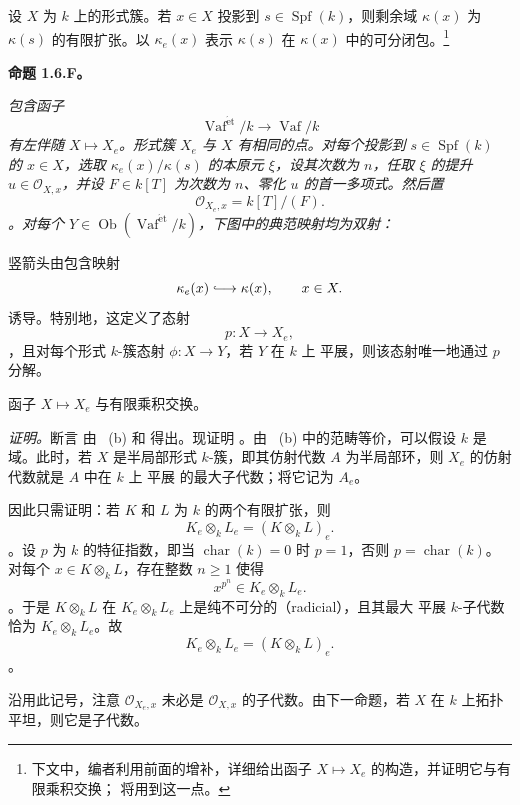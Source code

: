 设 \(X\) 为 \(k\) 上的形式簇。若 \(x\in X\) 投影到 \(s\in\operatorname{Spf}(k)\)，则剩余域 \(\kappa(x)\) 为 \(\kappa(s)\) 的有限扩张。以 \(\kappa_e(x)\) 表示 \(\kappa(s)\) 在 \(\kappa(x)\) 中的可分闭包。\footnote{\label{sga3:VIIB:nde:73}下文中，编者利用前面的增补，详细给出函子 \(X\mapsto X_e\) 的构造，并证明它与有限乘积交换； 将用到这一点。}

\medskip\noindent\textbf{命题 1.6.F。} \label{sga3:VIIB:1.6.F}{\itshape {} 包含函子 \[
  \operatorname{Vaf}^{\mathrm{\acute{e}t}}/k
  \longrightarrow
  \operatorname{Vaf}/k
\] 有左伴随 \(X\mapsto X_e\)。形式簇 \(X_e\) 与 \(X\) 有相同的点。对每个投影到 \(s\in\operatorname{Spf}(k)\) 的 \(x\in X\)，选取 \(\kappa_e(x)/\kappa(s)\) 的本原元 \(\xi\)，设其次数为 \(n\)，任取 \(\xi\) 的提升 \(u\in\mathcal O_{X,x}\)，并设 \(F\in k[T]\) 为次数为 \(n\)、零化 \(u\) 的首一多项式。然后置 \[
  \mathcal O_{X_e,x}=k[T]/(F).
\]。对每个 \(Y\in\operatorname{Ob}(\operatorname{Vaf}^{\mathrm{\acute{e}t}}/k)\)，下图中的典范映射均为双射：\begin{center} \label{sga3:VIIB:1.6.F:hom-square} \end{center}竖箭头由包含映射 \[
  \kappa_e(x)\lhook\joinrel\longrightarrow\kappa(x),
  \qquad x\in X.
\] 诱导。特别地，这定义了态射 \[
  p:X\longrightarrow X_e,
\]，且对每个形式 \(k\)-簇态射 \(\phi:X\to Y\)，若 \(Y\) 在 \(k\) 上 平展，则该态射唯一地通过 \(p\) 分解。

 函子 \(X\mapsto X_e\) 与有限乘积交换。}

\medskip\noindent\textit{证明。}断言 \textup{} 由 ~\textup{(b)} 和  得出。现证明 \textup{}。由 ~\textup{(b)} 中的范畴等价，可以假设 \(k\) 是域。此时，若 \(X\) 是半局部形式 \(k\)-簇，即其仿射代数 \(A\) 为半局部环，则 \(X_e\) 的仿射代数就是 \(A\) 中在 \(k\) 上 平展 的最大子代数；将它记为 \(A_e\)。

因此只需证明：若 \(K\) 和 \(L\) 为 \(k\) 的两个有限扩张，则 \[
  K_e\otimes_kL_e
  =
  (K\otimes_kL)_e.
\]。设 \(p\) 为 \(k\) 的特征指数，即当 \(\operatorname{char}(k)=0\) 时 \(p=1\)，否则 \(p=\operatorname{char}(k)\)。对每个 \(x\in K\otimes_kL\)，存在整数 \(n\geq1\) 使得 \[
  x^{p^n}\in K_e\otimes_kL_e.
\]。于是 \(K\otimes_kL\) 在 \(K_e\otimes_kL_e\) 上是纯不可分的（radicial），且其最大 平展 \(k\)-子代数恰为 \(K_e\otimes_kL_e\)。故 \[
  K_e\otimes_kL_e=(K\otimes_kL)_e.
\]。

沿用此记号，注意 \(\mathcal O_{X_e,x}\) 未必是 \(\mathcal O_{X,x}\) 的子代数。由下一命题，若 \(X\) 在 \(k\) 上拓扑平坦，则它是子代数。
